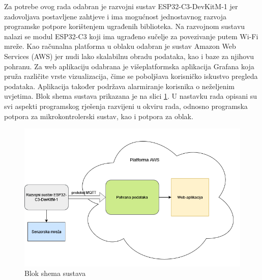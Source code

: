 Za potrebe ovog rada odabran je razvojni sustav ESP32-C3-DevKitM-1 jer zadovoljava postavljene zahtjeve i ima mogućnost jednostavnog razvoja programske potpore korištenjem ugrađenih biblioteka. Na razvojnom sustavu nalazi se modul ESP32-C3 koji ima ugrađeno sučelje za povezivanje putem Wi-Fi mreže. Kao računalna platforma u oblaku odabran je sustav Amazon Web Services (AWS) jer nudi lako skalabilnu obradu podataka, kao i baze za njihovu pohranu. Za web aplikaciju odabrana je višeplatformska aplikacija Grafana koja pruža različite vrste vizualizacija, čime se poboljšava korisničko iskustvo pregleda podataka. Aplikacija također podržava alarmiranje korisnika o neželjenim uvjetima. Blok shema sustava prikazana je na slici \ref{fig:shema}. U nastavku rada opisani su svi aspekti programskog rješenja razvijeni u okviru rada, odnosno programska potpora za mikrokontrolerski sustav, kao i potpora za oblak.

\begin{figure}[ht]
	\includegraphics[width=\linewidth]{imgs/shema}
	\caption{Blok shema sustava}
	\label{fig:shema}
\end{figure}

